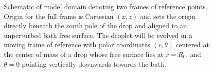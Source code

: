 \documentclass{article}
\begin{document}
\begin{figure}[h]
    \centering
    \caption{Schematic of model domain denoting two frames of reference points. Origin for the full frame is Cartesian $(x,z)$ and sets the origin directly beneath the south pole of the drop and aligned to an unperturbed bath free surface. The droplet will be evolved in a moving frame of reference with polar coordinates $(r,\theta)$ centered at the center of mass of a drop whose free surface lies at $r=R_0$, and $\theta=0$ pointing vertically downwards towards the bath.}
    \label{fig:model_domain}
\end{figure}
\end{document}
